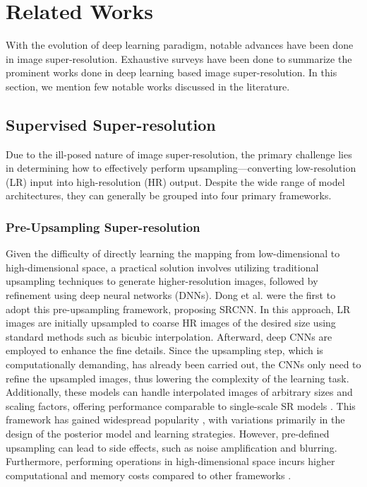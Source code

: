 \section{Related Works}
With the evolution of deep learning paradigm, notable advances have been done in image super-resolution. Exhaustive surveys \cite{sr056,sr057,sr058} have been done to summarize the prominent works done in deep learning based image super-resolution. In this section, we mention few notable works discussed in the literature.

\subsection{Supervised Super-resolution}
Due to the ill-posed nature of image super-resolution, the primary challenge lies in determining how to effectively perform upsampling—converting low-resolution (LR) input into high-resolution (HR) output. Despite the wide range of model architectures, they can generally be grouped into four primary frameworks.

\subsubsection{Pre-Upsampling Super-resolution}
Given the difficulty of directly learning the mapping from low-dimensional to high-dimensional space, a practical solution involves utilizing traditional upsampling techniques to generate higher-resolution images, followed by refinement using deep neural networks (DNNs). Dong et al. \cite{s1,s2} were the first to adopt this pre-upsampling framework, proposing SRCNN. In this approach, LR images are initially upsampled to coarse HR images of the desired size using standard methods such as bicubic interpolation. Afterward, deep CNNs are employed to enhance the fine details. Since the upsampling step, which is computationally demanding, has already been carried out, the CNNs only need to refine the upsampled images, thus lowering the complexity of the learning task. Additionally, these models can handle interpolated images of arbitrary sizes and scaling factors, offering performance comparable to single-scale SR models \cite{s3}. This framework has gained widespread popularity \cite{s4,s5,s6,s7}, with variations primarily in the design of the posterior model and learning strategies. However, pre-defined upsampling can lead to side effects, such as noise amplification and blurring. Furthermore, performing operations in high-dimensional space incurs higher computational and memory costs compared to other frameworks \cite{s8,s9}.

